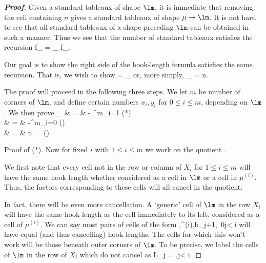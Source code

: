 \begin{proof}[\bf Proof]
Given a standard tableaux of shape $\lm$, it is immediate that removing the cell containing $n$ gives a standard tableaux of shape $\mu \to \lm$. It is not hard to see that all standard tableaux of a shape preceding $\lm$ can be obtained in such a manner. Thus we see that the number of standard tableaux satisfies the recursion
\be
f_{\lm} = \sum_{\mu \to \lm} f_{\mu}.
\ee

Our goal is to show the right side of the hook-length formula satisfies the same recursion. That is, we wish to show
\be
{} = \sum_{\mu\to \lm}
\ee
or, more simply,
\be
\sum_{\mu\to \lm}  = n.
\ee

The proof will proceed in the following three steps. We let $m$ be number of corners of $\lm$, and define certain numbers $x_i,y_i$ for $0\leq i\leq m$, depending on $\lm$. We then prove
\beast
\sum_{\mu\to \lm}   & = & - \sum^m_{i=1} \qquad \quad(*) \\
& = & -\sum^m_{i=0}  \qquad\qquad\qquad (\dag)\\
& = & n. \qquad \qquad\qquad \qquad \qquad\qquad \ \ (\ddag)
\eeast

Proof of ($*$). Now for fixed $i$ with $1\leq i\leq m$ we work on the quotient
\be
{}.
\ee

We first note that every cell not in the row or column of $X_i$ for $1\leq i\leq m$ will have the same hook length whether considered as a cell in $\lm$ or a cell in $\mu^{(i)}$. Thus, the factors corresponding to these cells will all cancel in the quotient.

In fact, there will be even more cancellation. A `generic' cell of $\lm$ in the row $X_i$ will have the same hook-length as the cell immediately to its left, considered as a cell of $\mu^{(i)}$. We can say most pairs of cells of the form
\be
{}\in \lm,\quad {}\in \mu^{(i)},\qquad b\neq \beta_j+1,\ 0\leq j< i
\ee
will have equal (and thus cancelling) hook-lengths. The cells for which this won't work will be those beneath outer corners of $\lm$. To be precise, we label the cells of $\lm$ in the row of $X_i$ which do not cancel as
\be
L_j = ,\leq j< i.
\ee


\end{proof}

